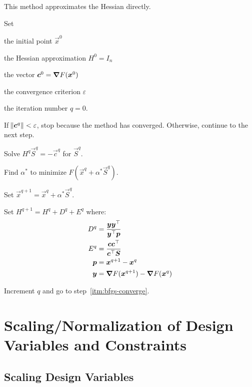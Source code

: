 \documentclass{article}
\begin{document}
This method approximates the Hessian directly.

\begin{enumerate*}
\item Set
  \begin{itemize*}
  \item the initial point \(\vec{x}^0\)
  \item the Hessian approximation \(H^0 = I_n\)
  \item the vector \(\bm{c}^0 = \bm{\nabla} F(\bm{x}^0)\)
  \item the convergence criterion \(\varepsilon\)
  \item the iteration number \(q = 0\).
  \end{itemize*}
\item \label{itm:bfgs-converge} If \(\norm{\bm{c}^q} < \varepsilon\), stop because the method has converged. Otherwise,
  continue to the next step.
\item Solve \(H^q\vec{S}^q = -\vec{c}^q\) for \(\vec{S}^q\).
\item Find \(\alpha^*\) to minimize \(F(\vec{x}^q + \alpha^* \vec{S}^q)\).
\item Set \(\vec{x}^{q+1} = \vec{x}^q + \alpha^* \vec{S}^q\).
\item Set \(H^{q+1} = H^q + D^q + E^q\) where:
  \begin{align*}
    D^q &= \frac{\bm{y}{{\bm{y}}^\top}}{{{\bm{y}}^\top}\bm{p}} \\
    E^q &= \frac{\bm{c}{{\bm{c}}^\top}}{{{\bm{c}}^\top}\bm{S}} \\
    \bm{p} &= \bm{x}^{q+1} - \bm{x}^q \\
    \bm{y} &= \bm{\nabla} F(\bm{x}^{q+1}) - \bm{\nabla} F(\bm{x}^q) \\
  \end{align*}
\item Increment \(q\) and go to step~\ref{itm:bfgs-converge}.
\end{enumerate*}

\section{Scaling\slash{}Normalization of Design Variables and Constraints}

\subsection{Scaling Design Variables}
\end{document}

